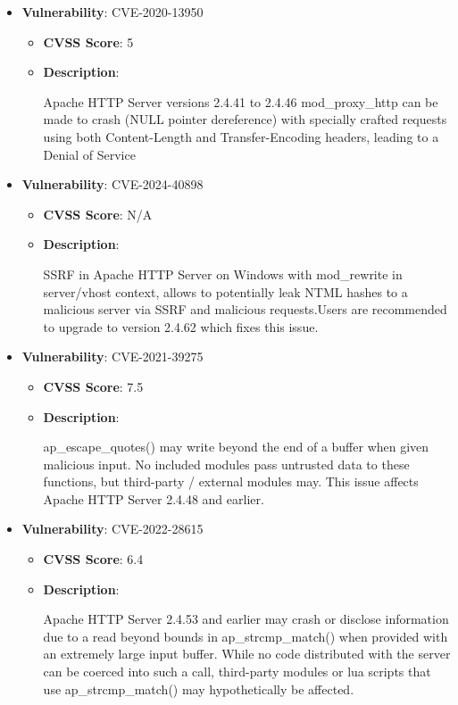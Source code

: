 \documentclass{article}
\begin{document}
\begin{itemize}
        \item \textbf{Vulnerability}: CVE-2020-13950
        \begin{itemize}
            \item \textbf{CVSS Score}:  5 
            \item \textbf{Description}:
            \parbox[t]{0.9\linewidth}{
                \ttfamily Apache HTTP Server versions 2.4.41 to 2.4.46 mod\_proxy\_http can be made to crash (NULL pointer dereference) with specially crafted requests using both Content-Length and Transfer-Encoding headers, leading to a Denial of Service
            }
        \end{itemize}
    
        \item \textbf{Vulnerability}: CVE-2024-40898
        \begin{itemize}
            \item \textbf{CVSS Score}:  N/A 
            \item \textbf{Description}:
            \parbox[t]{0.9\linewidth}{
                \ttfamily SSRF in Apache HTTP Server on Windows with mod\_rewrite in server/vhost context, allows to potentially leak NTML hashes to a malicious server via SSRF and malicious requests.Users are recommended to upgrade to version 2.4.62 which fixes this issue.
            }
        \end{itemize}
    
        \item \textbf{Vulnerability}: CVE-2021-39275
        \begin{itemize}
            \item \textbf{CVSS Score}:  7.5 
            \item \textbf{Description}:
            \parbox[t]{0.9\linewidth}{
                \ttfamily ap\_escape\_quotes() may write beyond the end of a buffer when given malicious input. No included modules pass untrusted data to these functions, but third-party / external modules may. This issue affects Apache HTTP Server 2.4.48 and earlier.
            }
        \end{itemize}
    
        \item \textbf{Vulnerability}: CVE-2022-28615
        \begin{itemize}
            \item \textbf{CVSS Score}:  6.4 
            \item \textbf{Description}:
            \parbox[t]{0.9\linewidth}{
                \ttfamily Apache HTTP Server 2.4.53 and earlier may crash or disclose information due to a read beyond bounds in ap\_strcmp\_match() when provided with an extremely large input buffer. While no code distributed with the server can be coerced into such a call, third-party modules or lua scripts that use ap\_strcmp\_match() may hypothetically be affected.
            }
        \end{itemize}
    

\end{itemize}
\end{document}
